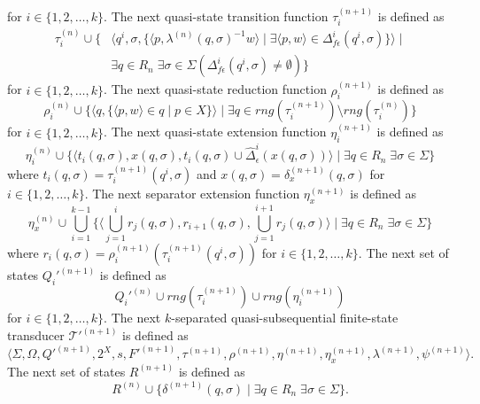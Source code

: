 for $i \in \{ 1, 2, \ldots, k \}$.
The next quasi-state transition function $\tau_i^{(n+1)}$ is defined as
\begin{align*}
  \tau_i^{(n)} \cup \{ &\langle q^i, \sigma,
  \{ \langle p, \lambda^{(n)}(q, \sigma)^{-1}w \rangle \mid \exists \langle
  p, w \rangle \in \Delta_{f\epsilon}^i(q^i, \sigma) \} \rangle \mid\\
  &\exists q \in R_n \; \exists \sigma \in \Sigma (\Delta_{f\epsilon}^i(q^i, \sigma)
  \neq \emptyset) \}
\end{align*}
for $i \in \{ 1, 2, \ldots, k \}$.
The next quasi-state reduction function $\rho_i^{(n+1)}$ is defined as
\begin{equation*}
  \rho_i^{(n)} \cup \{ \langle q, \{ \langle p, w \rangle \in q \mid p \in X \}
  \rangle \mid \exists q \in rng(\tau_i^{(n+1)}) \setminus rng(\tau_i^{(n)}) \}
\end{equation*}
for $i \in \{ 1, 2, \ldots, k \}$.
The next quasi-state extension function $\eta_i^{(n+1)}$ is defined as
\begin{equation*}
  \eta_i^{(n)} \cup \{ \langle t_i(q, \sigma), x(q, \sigma),
  t_i(q, \sigma) \cup \hat{\Delta}_\epsilon^i(x(q, \sigma))
  \rangle \mid \exists q \in R_n \; \exists \sigma \in \Sigma \}
\end{equation*}
where $t_i(q, \sigma) = \tau_i^{(n+1)}(q^i, \sigma)$ and $x(q, \sigma) =
\delta_x^{(n+1)}(q, \sigma)$ for $i \in \{ 1, 2, \ldots, k \}$.
The next separator extension function $\eta_x^{(n+1)}$ is defined as
\begin{equation*}
  \eta_x^{(n)} \cup \bigcup_{i=1}^{k-1} \{ \langle \bigcup_{j=1}^i r_j(q, \sigma),
  r_{i+1}(q, \sigma), \bigcup_{j=1}^{i+1} r_j(q, \sigma) \rangle \mid \exists q \in
  R_n \; \exists \sigma \in \Sigma \}
\end{equation*}
where $r_i(q, \sigma) = \rho_i^{(n+1)}(\tau_i^{(n+1)}(q^i, \sigma))$ for $i \in \{
1, 2, \ldots, k \}$.
The next set of states $Q_i'^{(n+1)}$ is defined as
\begin{equation*}
  Q_i'^{(n)} \cup rng(\tau_i^{(n+1)}) \cup rng(\eta_i^{(n+1)})
\end{equation*}
for $i \in \{ 1, 2, \ldots, k \}$.
The next $k$-separated quasi-subsequential finite-state transducer
$\mathcal{T}'^{(n+1)}$ is defined as
\begin{equation*}
  \langle \Sigma, \Omega, Q'^{(n+1)}, 2^X, s, F'^{(n+1)}, \tau^{(n+1)},
  \rho^{(n+1)}, \eta^{(n+1)}, \eta_x^{(n+1)}, \lambda^{(n+1)}, \psi^{(n+1)} \rangle.
\end{equation*}
The next set of states $R^{(n+1)}$ is defined as
\begin{equation*}
  R^{(n)} \cup \{ \delta^{(n+1)}(q, \sigma) \mid \exists q \in R_n \; \exists
  \sigma \in \Sigma \}.
\end{equation*}

